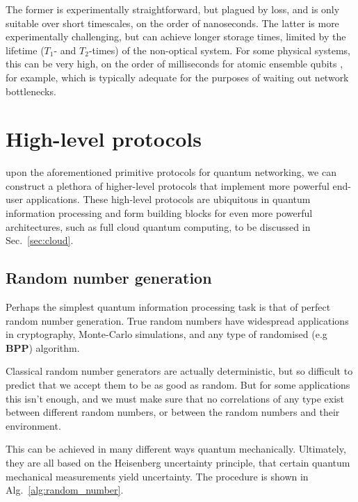 The former is experimentally straightforward, but plagued by loss, and is only suitable over short timescales, on the order of nanoseconds. The latter is more experimentally challenging, but can achieve longer storage times, limited by the lifetime ($T_1$- and $T_2$-times) of the non-optical system. For some physical systems, this can be very high, on the order of milliseconds for atomic ensemble qubits \cite{bib:Duan01, bib:Duan02, bib:LauratKimble07}, for example, which is typically adequate for the purposes of waiting out network bottlenecks.

%
%

\section{High-level protocols} 

 upon the aforementioned primitive protocols for quantum networking, we can construct a plethora of higher-level protocols that implement more powerful end-user applications. These high-level protocols are ubiquitous in quantum information processing and form building blocks for even more powerful architectures, such as full cloud quantum computing, to be discussed in Sec.~\ref{sec:cloud}.

%
%

\subsection{Random number generation} 

Perhaps the simplest quantum information processing task is that of perfect random number generation. True random numbers have widespread applications in cryptography, Monte-Carlo simulations, and any type of randomised (e.g \textbf{BPP}) algorithm.

Classical random number generators are actually deterministic, but so difficult to predict that we accept them to be as good as random. But for some applications this isn't enough, and we must make sure that no correlations of any type exist between different random numbers, or between the random numbers and their environment.

This can be achieved in many different ways quantum mechanically. Ultimately, they are all based on the Heisenberg uncertainty principle, that certain quantum mechanical measurements yield uncertainty. The procedure is shown in Alg.~\ref{alg:random_number}.

